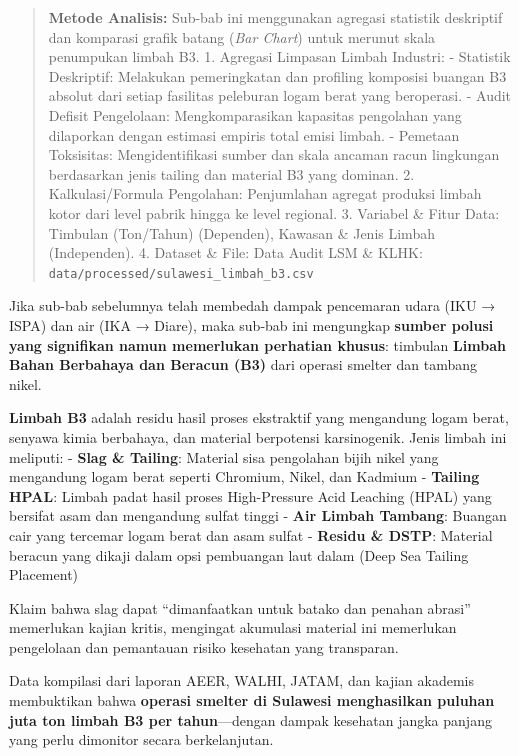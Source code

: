 \documentclass[
]{article}
\begin{document}
\begin{quote}
\textbf{Metode Analisis:} Sub-bab ini menggunakan agregasi statistik
deskriptif dan komparasi grafik batang (\emph{Bar Chart}) untuk merunut
skala penumpukan limbah B3. 1. Agregasi Limpasan Limbah Industri: -
Statistik Deskriptif: Melakukan pemeringkatan dan profiling komposisi
buangan B3 absolut dari setiap fasilitas peleburan logam berat yang
beroperasi. - Audit Defisit Pengelolaan: Mengkomparasikan kapasitas
pengolahan yang dilaporkan dengan estimasi empiris total emisi limbah. -
Pemetaan Toksisitas: Mengidentifikasi sumber dan skala ancaman racun
lingkungan berdasarkan jenis tailing dan material B3 yang dominan. 2.
Kalkulasi/Formula Pengolahan: Penjumlahan agregat produksi limbah kotor
dari level pabrik hingga ke level regional. 3. Variabel \& Fitur Data:
Timbulan (Ton/Tahun) (Dependen), Kawasan \& Jenis Limbah (Independen).
4. Dataset \& File: Data Audit LSM \& KLHK:
\texttt{data/processed/sulawesi\_limbah\_b3.csv}
\end{quote}

Jika sub-bab sebelumnya telah membedah dampak pencemaran udara (IKU →
ISPA) dan air (IKA → Diare), maka sub-bab ini mengungkap \textbf{sumber
polusi yang signifikan namun memerlukan perhatian khusus}: timbulan
\textbf{Limbah Bahan Berbahaya dan Beracun (B3)} dari operasi smelter
dan tambang nikel.

\textbf{Limbah B3} adalah residu hasil proses ekstraktif yang mengandung
logam berat, senyawa kimia berbahaya, dan material berpotensi
karsinogenik. Jenis limbah ini meliputi: - \textbf{Slag \& Tailing}:
Material sisa pengolahan bijih nikel yang mengandung logam berat seperti
Chromium, Nikel, dan Kadmium - \textbf{Tailing HPAL}: Limbah padat hasil
proses High-Pressure Acid Leaching (HPAL) yang bersifat asam dan
mengandung sulfat tinggi - \textbf{Air Limbah Tambang}: Buangan cair
yang tercemar logam berat dan asam sulfat - \textbf{Residu \& DSTP}:
Material beracun yang dikaji dalam opsi pembuangan laut dalam (Deep Sea
Tailing Placement)

Klaim bahwa slag dapat ``dimanfaatkan untuk batako dan penahan abrasi''
memerlukan kajian kritis, mengingat akumulasi material ini memerlukan
pengelolaan dan pemantauan risiko kesehatan yang transparan.

Data kompilasi dari laporan AEER, WALHI, JATAM, dan kajian akademis
membuktikan bahwa \textbf{operasi smelter di Sulawesi menghasilkan
puluhan juta ton limbah B3 per tahun}---dengan dampak kesehatan jangka
panjang yang perlu dimonitor secara berkelanjutan.
\end{document}

